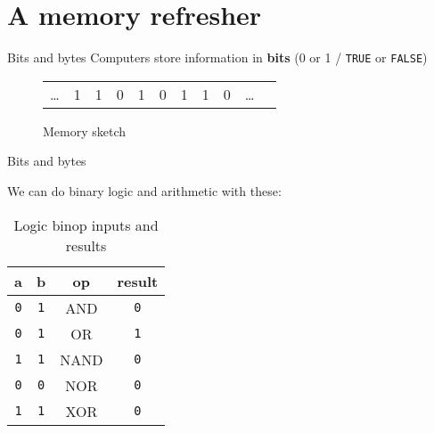 \documentclass[../index.tex]{subfiles}
\begin{document}
\renewcommand{\sectiontitle}{A memory refresher}
\section{\sectiontitle}

\renewcommand{\currenttitle}{Bits and bytes}
\begin{frame}{\currenttitle}
%
  Computers store information in \textbf{bits} (0 or 1 / \texttt{TRUE} or \texttt{FALSE})
  \vspace*{2em}

  \begin{center}
    \begin{figure}
      \begin{table}
        \begin{tabular}{c|c|c|c|c|c|c|c|c|c}
          \hline
          \dots & 1 & 1 & 0 & 1 & 0 & 1 & 1 & 0 & \dots &
          \hline
        \end{tabular}
      \end{table}
      \caption{Memory sketch}
    \end{figure}
  \end{center}
\end{frame}

\begin{frame}{\currenttitle}
  \newcommand{\false}{\texttt{0}}
  \newcommand{\true}{\texttt{1}}

  We can do binary logic and arithmetic with these:

  \begin{table}
    \begin{tabular}{c c c c}
      a & b & op & result \\
      \hline{}
      \false{} & \true{} & AND & \false{} \\
      \false{} & \true{} & OR & \true{} \\
      \true{} & \true{} & NAND & \false{} \\
      \false{} & \false{} & NOR & \false{} \\
      \true{} & \true{} & XOR & \false{}
    \end{tabular}
    \caption{Logic binop inputs and results}
  \end{table}
\end{frame}
\end{document}
